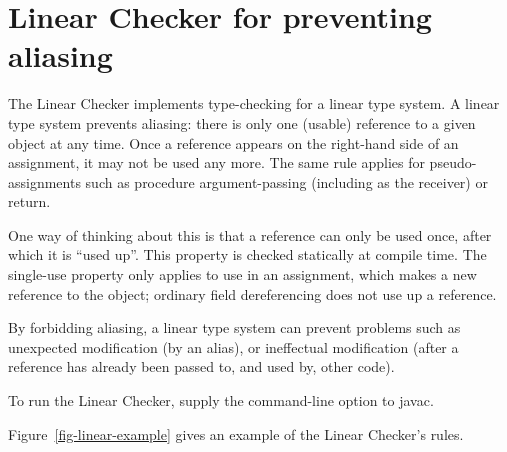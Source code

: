 \htmlhr
\chapter{Linear Checker for preventing aliasing\label{linear-checker}}

The Linear Checker implements type-checking for a linear type system.  A
linear type system prevents aliasing:  there is only one (usable) reference
to a given object at any time.  Once a reference appears on the right-hand
side of an assignment, it may not be used any more.  The same rule applies
for pseudo-assignments such as procedure argument-passing (including as the
receiver) or return.

One way of thinking about this is that a reference can only be used once,
after which it is ``used up''.  This property is checked statically at
compile time.  The single-use property only applies to use in an
assignment, which makes a new reference to the object; ordinary field
dereferencing does not use up a reference.

By forbidding aliasing, a linear type system can prevent problems such as
unexpected modification (by an alias), or ineffectual modification (after a
reference has already been passed to, and used by, other code).




To run the Linear Checker, supply the
command-line option to javac.


Figure~\ref{fig-linear-example} gives an example of the Linear Checker's rules.

